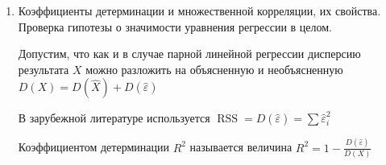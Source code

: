 \begin{enumerate}
    $a_{ij} = \begin{pmatrix}Z_1^{(i)} & \dots & Z_n^{(i)}\end{pmatrix} \begin{pmatrix}Z_1^{(j)} \\ \vdots \\ Z_n^{(j)}\end{pmatrix} = 
    \begin{cases}
        n \overline{Z_i Z_j} = \gamma_i r_{Z_i, Z_j}, & \text{ при } i \neq j \\
        n \overline{Z_i^2} = n D Z_i = n, & \text{ при } i = j
    \end{cases}$

    Перевод коэффициентов можно выполнять по формулам:

    $b_i = \gamma_i \frac{\sigma_X}{\sigma_{Z_i}}; \quad \gamma_i = b \frac{\sigma_{Z_i}}{\sigma_X}$, $b_0 = \overline{x} - \sum_{i = 1}^n b_i \overline{z_i}$

    Значение $\gamma_i$ можно трактовать как величину прямого влияния $i$-ого фактора на результат. Остальные слагаемые в $i$-ом уравнении можно трактовать
    как величины косвенного влияния остальных факторов 

    $r_{Z_i Z_1} \gamma_1 + \dots + \gamma_i + \dots + r_{Z_i Z_k} \gamma_k = r_{Z_i, X}$

    Величину $r_{Z_i, X}$ можно рассматривать как сумму прямого и косвенного влияний

    \Nota Для измерения тесноты отдельной связи между отдельным фактором и результатом при очищении влиянии других факторов
    есть понятие коэффициента частной корреляции. При $k = 2$: $r_{X, Z_1 / Z_2} = \frac{r_{X, Z_1} - r_{X, Z_2} r_{Z_1, Z_2}}{\sqrt{(1 - r_{X, Z_2}^2)(1 - r_{Z_1, Z_2}^2)}}$

    \item Коэффициенты детерминации и множественной корреляции, их свойства. Проверка гипотезы о значимости уравнения регрессии в целом.

    Допустим, что как и в случае парной линейной регрессии дисперсию результата $X$ можно разложить на объясненную и необъясненную $D(X) = D(\hat X) + D(\hat \varepsilon)$

    \Nota В зарубежной литературе используется $\operatorname{RSS} = D(\hat \varepsilon) = \sum \hat \varepsilon_i^2$

    \Def Коэффициентом детерминации $R^2$ называется величина $R^2 = 1 - \frac{D(\hat \varepsilon)}{D(X)}$


\end{enumerate}
